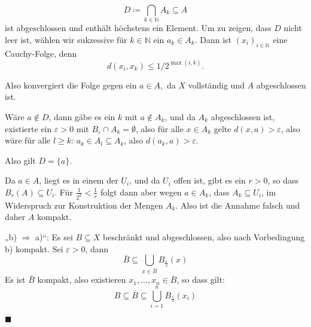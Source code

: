 \documentclass[12pt]{scrbook}   %
\newcommand{\da}{\coloneqq}
\begin{document}
$$D \da \bigcap_{k\in \mathbb N} A_k \subseteq A$$ ist abgeschlossen und enthält höchstens ein Element. Um zu zeigen, dass $D$ nicht leer ist, wählen wir sukzessive für $k\in \mathbb N$ ein  $a_k \in A_k$. Dann ist $(x_i)_{i\in \mathbb N}$ eine Cauchy-Folge, denn 
$$d(x_i,x_k) \leq 1/2^{\max (i,k)}.$$

Also konvergiert die Folge gegen ein $a\in A,$ da $X$ vollständig und $A$
abgeschlossen ist.

Wäre $a\notin D$, dann gäbe es ein $k$ mit $a\notin A_k$, und da $A_k$ abgeschlossen ist, existierte ein $\varepsilon >0$ mit $B_\varepsilon\cap A_k =\emptyset$, also für alle $x\in A_k$ gelte $d(x,a) > \varepsilon$, also wäre für alle $l\ge k$: $a_k \in A_l \subseteq A_k$, also $d(a_k, a) > \varepsilon$.

Also gilt $D=\{a\}$.

Da $a\in A$, liegt es in einem der $U_i$, und da $U_i$ offen ist, gibt es ein $r>0$, so dass $B_r(A)\subseteq U_i$. Für $\frac1{2^k}<\frac 1r$ folgt dann aber wegen $a\in A_k$, dass $A_k \subseteq U_i$, im Widerspruch zur Konstruktion der Mengen $A_k$. Also ist die Annahme falsch und daher $A$ kompakt.

„b) $\Longrightarrow$ a)“: Es sei $B\subseteq X$ beschränkt und abgeschlossen, also nach Vorbedingung b) kompakt. Sei $\varepsilon > 0$, dann $$\bar B \subseteq \bigcup_{x\in\bar B} B_{\frac \varepsilon2}(x)$$
Es ist $\bar B$ kompakt, also existieren $x_1,\ldots,x_n \in \bar B$, so dass gilt:
$$ B\subseteq \bar B \subseteq  \bigcup_{i=1}^n B_{\frac \varepsilon2}(x_i)$$

\hfill{$\blacksquare$}
\end{document}
